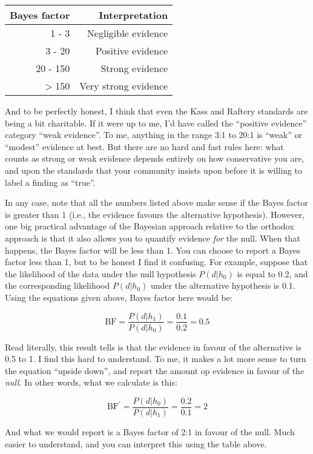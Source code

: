 \begin{center}
\begin{tabular}{r|r}
Bayes factor & Interpretation \\ \hline
1 - 3 & Negligible evidence \\
3 - 20 & Positive evidence \\
20 - 150 & Strong evidence \\
$>$150 & Very strong evidence
\end{tabular}
\end{center} 

\noindent
And to be perfectly honest, I think that even the Kass and Raftery standards are being a bit charitable. If it were up to me, I'd have called the ``positive evidence'' category ``weak evidence''. To me, anything in the range 3:1 to 20:1 is ``weak'' or ``modest'' evidence at best. But there are no hard and fast rules here: what counts as strong or weak evidence depends entirely on how conservative you are, and upon the standards that your community insists upon before it is willing to label a finding as ``true''. 

In any case, note that all the numbers listed above make sense if the Bayes factor is greater than 1 (i.e., the evidence favours the alternative hypothesis). However, one big practical advantage of the Bayesian approach relative to the orthodox approach is that it also allows you to quantify evidence {\it for} the null. When that happens, the Bayes factor will be less than 1. You can choose to report a Bayes factor less than 1, but to be honest I find it confusing. For example, suppose that the likelihood of the data under the null hypothesis $P(d|h_0)$ is equal to 0.2, and the corresponding likelihood $P(d|h_0)$ under the alternative hypothesis is 0.1. Using the equations given above,  Bayes factor here would be:

$$ 
\mbox{BF} = \frac{P(d|h_1)}{P(d|h_0)} = \frac{0.1}{0.2} = 0.5
$$

\noindent
Read literally, this result tells is that the evidence in favour of the alternative is 0.5 to 1. I find this hard to understand. To me, it makes  a lot more sense to turn the equation ``upside down'', and report the amount op evidence in favour of the {\it null}. In other words, what we calculate is this:

$$ 
\mbox{BF}^\prime = \frac{P(d|h_0)}{P(d|h_1)} = \frac{0.2}{0.1} = 2
$$

\noindent
And what we would report is a Bayes factor of 2:1 in favour of the null. Much easier to understand, and you can interpret this using the table above. 




